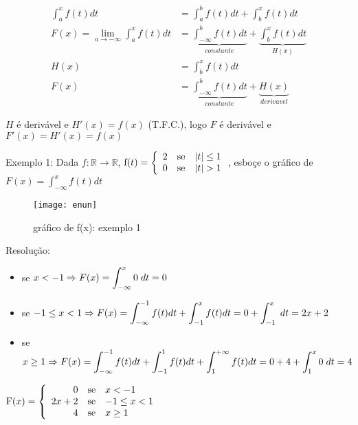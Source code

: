 \documentclass[12pt,openany]{book}
\begin{document}
\begin{align*}
\int_a^x f(t)dt &= \int_a^b f(t)dt + \int_b^x f(t)dt \\
F(x) = \lim_{a\rightarrow - \infty}\int_a^xf(t)dt &= \underbrace{\int_{-\infty}^b f(t)dt}_{constante} + \underbrace{\int_b^x f(t)dt}_{H(x)}\\
H(x) &= \int_b^x f(t)dt \\
F(x) &= \underbrace{\int_{-\infty}^b f(t)dt}_{constante}+ \underbrace{H(x)}_{derivavel} 
\end{align*}

$H$ é derivável e $H'(x) = f(x)$ (T.F.C.), logo $F$ é derivável e $F'(x)=H'(x)=f(x)$

\vspace{20pt}
Exemplo 1: Dada $f:\mathds{R}\rightarrow\mathds{R}$, $\hbox{f}(t)
= \left\{ \begin{array}{rll}
2 & \hbox{se} &  |t| \leq 1 \\
0 & \hbox{se} &  |t|  > 1 \\
\end{array}\right.$, esboçe o gráfico de $\displaystyle{F(x)=\int_{-\infty}^x f(t)dt}$
\begin{figure}[ht]
\centering
\texttt{[image: enun]}
\caption{gráfico de f(x): exemplo 1}
\label{fig:en1}
\end{figure}

Resolução:
\begin{itemize}
\item se $\displaystyle{x<-1 \Rightarrow F(x) = \int_{-\infty}^x 0\hspace{1mm}dt = 0}$
\item se $\displaystyle{ -1 \leq x < 1 \Rightarrow F(x) = \int_{-\infty}^{-1} f(t) dt + \int_{-1}^x f(t)dt = 0 + \int_{-1}^x \hspace{1mm}dt = 2x+2}$
\item se $\displaystyle{ x \geq 1 \Rightarrow F(x) = \int_{-\infty}^{-1} f(t) dt + \int_{-1}^1 f(t)dt + \int_1^{+\infty}f(t)dt = 0 + 4+ \int_1^x 0 \hspace{1mm}dt = 4}$
\end{itemize}

$\hbox{F}(x)
= \left\{ \begin{array}{rll}
0 & \hbox{se} &  x <-1 \\
2x+2 & \hbox{se} &  -1 \leq x < 1 \\
4 & \hbox{se} & x \geq 1 \\
\end{array}\right.$
\end{document}
